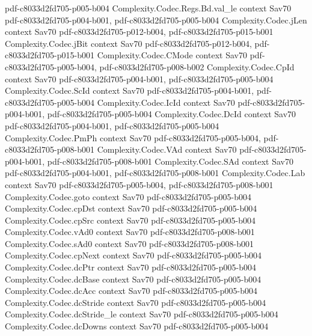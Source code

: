 \begin{theorem}
{    pdf-c8033d2fd705-p005-b004}
\proofstep
  {Complexity.Codec.Regs.Bd.val_le}
  {context}
  {Sav70}
  {pdf-c8033d2fd705-p004-b001,
    pdf-c8033d2fd705-p005-b004}
\proofstep
  {Complexity.Codec.jLen}
  {context}
  {Sav70}
  {pdf-c8033d2fd705-p012-b004,
    pdf-c8033d2fd705-p015-b001}
\proofstep
  {Complexity.Codec.jBit}
  {context}
  {Sav70}
  {pdf-c8033d2fd705-p012-b004,
    pdf-c8033d2fd705-p015-b001}
\proofstep
  {Complexity.Codec.CMode}
  {context}
  {Sav70}
  {pdf-c8033d2fd705-p005-b004,
    pdf-c8033d2fd705-p008-b002}
\proofstep
  {Complexity.Codec.CpId}
  {context}
  {Sav70}
  {pdf-c8033d2fd705-p004-b001,
    pdf-c8033d2fd705-p005-b004}
\proofstep
  {Complexity.Codec.ScId}
  {context}
  {Sav70}
  {pdf-c8033d2fd705-p004-b001,
    pdf-c8033d2fd705-p005-b004}
\proofstep
  {Complexity.Codec.IcId}
  {context}
  {Sav70}
  {pdf-c8033d2fd705-p004-b001,
    pdf-c8033d2fd705-p005-b004}
\proofstep
  {Complexity.Codec.DcId}
  {context}
  {Sav70}
  {pdf-c8033d2fd705-p004-b001,
    pdf-c8033d2fd705-p005-b004}
\proofstep
  {Complexity.Codec.PmPh}
  {context}
  {Sav70}
  {pdf-c8033d2fd705-p005-b004,
    pdf-c8033d2fd705-p008-b001}
\proofstep
  {Complexity.Codec.VAd}
  {context}
  {Sav70}
  {pdf-c8033d2fd705-p004-b001,
    pdf-c8033d2fd705-p008-b001}
\proofstep
  {Complexity.Codec.SAd}
  {context}
  {Sav70}
  {pdf-c8033d2fd705-p004-b001,
    pdf-c8033d2fd705-p008-b001}
\proofstep
  {Complexity.Codec.Lab}
  {context}
  {Sav70}
  {pdf-c8033d2fd705-p005-b004,
    pdf-c8033d2fd705-p008-b001}
\proofstep
  {Complexity.Codec.goto}
  {context}
  {Sav70}
  {pdf-c8033d2fd705-p005-b004}
\proofstep
  {Complexity.Codec.cpDst}
  {context}
  {Sav70}
  {pdf-c8033d2fd705-p005-b004}
\proofstep
  {Complexity.Codec.cpSrc}
  {context}
  {Sav70}
  {pdf-c8033d2fd705-p005-b004}
\proofstep
  {Complexity.Codec.vAd0}
  {context}
  {Sav70}
  {pdf-c8033d2fd705-p008-b001}
\proofstep
  {Complexity.Codec.sAd0}
  {context}
  {Sav70}
  {pdf-c8033d2fd705-p008-b001}
\proofstep
  {Complexity.Codec.cpNext}
  {context}
  {Sav70}
  {pdf-c8033d2fd705-p005-b004}
\proofstep
  {Complexity.Codec.dcPtr}
  {context}
  {Sav70}
  {pdf-c8033d2fd705-p005-b004}
\proofstep
  {Complexity.Codec.dcBase}
  {context}
  {Sav70}
  {pdf-c8033d2fd705-p005-b004}
\proofstep
  {Complexity.Codec.dcAcc}
  {context}
  {Sav70}
  {pdf-c8033d2fd705-p005-b004}
\proofstep
  {Complexity.Codec.dcStride}
  {context}
  {Sav70}
  {pdf-c8033d2fd705-p005-b004}
\proofstep
  {Complexity.Codec.dcStride_le}
  {context}
  {Sav70}
  {pdf-c8033d2fd705-p005-b004}
\proofstep
  {Complexity.Codec.dcDowns}
  {context}
  {Sav70}
  {pdf-c8033d2fd705-p005-b004}

\end{theorem}
